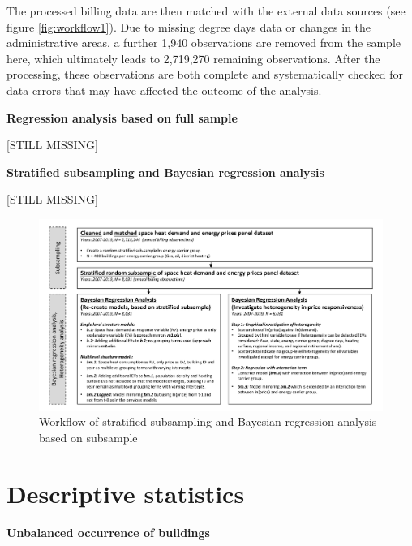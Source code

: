 \documentclass[12pt,twoside]{reedthesis}
\begin{document}
The processed billing data are then matched with the external data sources (see figure \ref{fig:workflow1}). Due to missing degree days data or changes in the administrative areas, a further 1,940 observations are removed from the sample here, which ultimately leads to 2,719,270 remaining observations. After the processing, these observations are both complete and systematically checked for data errors that may have affected the outcome of the analysis.

\textbf{Regression analysis based on full sample}

{[}STILL MISSING{]}

\textbf{Stratified subsampling and Bayesian regression analysis}

{[}STILL MISSING{]}
\begin{figure}

{\centering \includegraphics[width=1.03\linewidth]{figure/workflow_diagramm_part2} 

}

\caption{Workflow of stratified subsampling and Bayesian regression analysis based on subsample}\label{fig:workflow2}
\end{figure}
\hypertarget{descriptives}{%
\section{Descriptive statistics}\label{descriptives}}

\textbf{Unbalanced occurrence of buildings}
\end{document}
